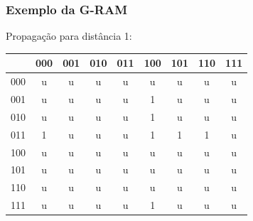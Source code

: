 \documentclass{beamer}
\begin{document}
\begin{frame}
    \frametitle{Exemplo da G-RAM}
    Propagação para distância 1:

    \begin{table}
        \centering
        \begin{tabular}{|c|c|c|c|c|c|c|c|c|}
            \hline
                & 000 & 001 & 010 & 011 & 100 & 101 & 110 & 111\\
            \hline
            000 &  u  &  u  &  u  &  u  &  u  &  u  &  u  &  u \\
            \hline
            001 &  u  &  u  &  u  &  u  &  \alert 1  &  u  &  u  &  u \\
            \hline
            010 &  u  &  u  &  u  &  u  &  \alert 1  &  u  &  u  &  u \\
            \hline
            011 &  \alert 1  &  u  &  u  &  u  &  1  &  \alert 1  &  \alert 1  &  u \\
            \hline
            100 &  u  &  u  &  u  &  u  &  u  &  u  &  u  &  u \\
            \hline
            101 &  u  &  u  &  u  &  u  &  u  &  u  &  u  &  u \\
            \hline
            110 &  u  &  u  &  u  &  u  &  u  &  u  &  u  &  u \\
            \hline
            111 &  u  &  u  &  u  &  u  &  \alert 1  &  u  &  u  &  u \\
            \hline

        \end{tabular}
    \end{table}
\end{frame}
\end{document}
